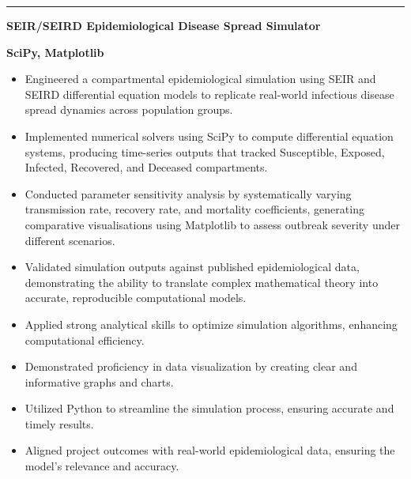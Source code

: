 \documentclass[11pt, a4paper]{article}
\begin{document}
\vspace{8pt}
\noindent%
{\color{DKGreen}\rule{4pt}{14pt}}\hspace{6pt}%
\textcolor{DarkTxt}{\textbf{\large SEIR/SEIRD Epidemiological Disease Spread Simulator}}\par
\vspace{1pt}
\noindent\hspace{10pt}\textcolor{DKGreen}{\textbf{\small SciPy, Matplotlib}}
\vspace{2pt}
\begin{itemize}
  \item \textcolor{MidTxt}{Engineered a compartmental epidemiological simulation using SEIR and SEIRD differential equation models to replicate real-world infectious disease spread dynamics across population groups.}
  \item \textcolor{MidTxt}{Implemented numerical solvers using SciPy to compute differential equation systems, producing time-series outputs that tracked Susceptible, Exposed, Infected, Recovered, and Deceased compartments.}
  \item \textcolor{MidTxt}{Conducted parameter sensitivity analysis by systematically varying transmission rate, recovery rate, and mortality coefficients, generating comparative visualisations using Matplotlib to assess outbreak severity under different scenarios.}
  \item \textcolor{MidTxt}{Validated simulation outputs against published epidemiological data, demonstrating the ability to translate complex mathematical theory into accurate, reproducible computational models.}
  \item \textcolor{MidTxt}{Applied strong analytical skills to optimize simulation algorithms, enhancing computational efficiency.}
  \item \textcolor{MidTxt}{Demonstrated proficiency in data visualization by creating clear and informative graphs and charts.}
  \item \textcolor{MidTxt}{Utilized Python to streamline the simulation process, ensuring accurate and timely results.}
  \item \textcolor{MidTxt}{Aligned project outcomes with real-world epidemiological data, ensuring the model's relevance and accuracy.}
\end{itemize}
\vspace{2pt}
\end{document}
